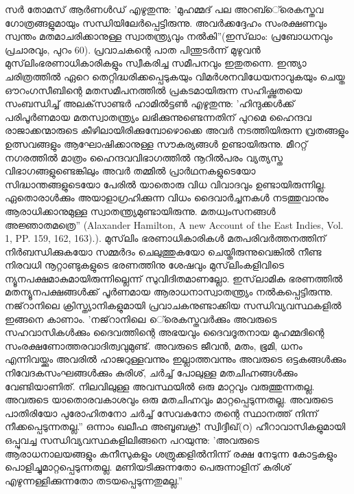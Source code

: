സര്‍ തോമസ് ആര്‍ണള്‍ഡ് എഴുതുന്നു: 'മുഹമ്മദ് പല അറബ്‌െ്രെകസ്തവ ഗോത്രങ്ങളുമായും സന്ധിയിലേര്‍പ്പെട്ടിരുന്നു. അവര്‍ക്കദ്ദേഹം സംരക്ഷണവും സ്വന്തം മതമാചരിക്കാനുള്ള സ്വാതന്ത്യ്രവും നല്‍കി''(ഇസ്‌ലാം: പ്രബോധനവും പ്രചാരവും, പുറം 60).
പ്രവാചകന്റെ പാത പിന്തുടര്‍ന്ന് മുഴുവന്‍ മുസ്‌ലിംഭരണാധികാരികളും സ്വീകരിച്ച സമീപനവും ഇതുതന്നെ. ഇന്ത്യാ ചരിത്രത്തില്‍ ഏറെ തെറ്റിദ്ധരിക്കപ്പെടുകയും വിമര്‍ശനവിധേയനാവുകയും ചെയ്ത ഔറംഗസീബിന്റെ മതസമീപനത്തില്‍ പ്രകടമായിരുന്ന സഹിഷ്ണുതയെ സംബന്ധിച്ച് അലക്‌സാണ്ടര്‍ ഹാമില്‍ട്ടണ്‍ എഴുതുന്നു: 'ഹിന്ദുക്കള്‍ക്ക് പരിപൂര്‍ണമായ മതസ്വാതന്ത്യ്രം ലഭിക്കുന്നുണ്ടെന്നതിന് പുറമെ ഹൈന്ദവ രാജാക്കന്മാരുടെ കീഴിലായിരിക്കുമ്പോഴൊക്കെ അവര്‍ നടത്തിയിരുന്ന വ്രതങ്ങളും ഉത്സവങ്ങളും ആഘോഷിക്കാനുള്ള സൗകര്യങ്ങള്‍ ഉണ്ടായിരുന്നു. മീററ്റ് നഗരത്തില്‍ മാത്രം ഹൈന്ദവവിഭാഗത്തില്‍ നൂറില്‍പരം വ്യത്യസ്ത വിഭാഗങ്ങളുണ്ടെങ്കിലും അവര്‍ തമ്മില്‍ പ്രാര്‍ഥനകളുടെയോ സിദ്ധാന്തങ്ങളുടെയോ പേരില്‍ യാതൊരു വിധ വിവാദവും ഉണ്ടായിരുന്നില്ല. ഏതൊരാള്‍ക്കും അയാളാഗ്രഹിക്കുന്ന വിധം ദൈവാര്‍ച്ചനകള്‍ നടത്തുവാനും ആരാധിക്കാനുമുള്ള സ്വാതന്ത്യ്രമുണ്ടായിരുന്നു. മതധ്വംസനങ്ങള്‍ അജ്ഞാതമത്രെ'' (Alaxander Hamilton, A new Account of the East Indies, Vol. 1, PP. 159, 162, 163).).
മുസ്‌ലിം ഭരണാധികാരികള്‍ മതപരിവര്‍ത്തനത്തിന് നിര്‍ബന്ധിക്കുകയോ സമ്മര്‍ദം ചെലുത്തുകയോ ചെയ്തിരുന്നുവെങ്കില്‍ നീണ്ട നിരവധി നൂറ്റാണ്ടുകളുടെ ഭരണത്തിനു ശേഷവും മുസ്‌ലിംകളിവിടെ ന്യൂനപക്ഷമാകുമായിരുന്നില്ലെന്ന് സുവിദിതമാണല്ലോ.
ഇസ്‌ലാമിക ഭരണത്തില്‍ മതന്യൂനപക്ഷങ്ങള്‍ക്ക് പൂര്‍ണമായ ആരാധനാസ്വാതന്ത്യ്രം നല്‍കപ്പെട്ടിരുന്നു. നജ്‌റാനിലെ ക്രിസ്ത്യാനികളുമായി പ്രവാചകനുണ്ടാക്കിയ സന്ധിവ്യവസ്ഥകളില്‍ ഇങ്ങനെ കാണാം. 'നജ്‌റാനിലെ െ്രെകസ്തവര്‍ക്കും അവരുടെ സഹവാസികള്‍ക്കും ദൈവത്തിന്റെ അഭയവും ദൈവദൂതനായ മുഹമ്മദിന്റെ സംരക്ഷണോത്തരവാദിത്വവുമുണ്ട്. അവരുടെ ജീവന്‍, മതം, ഭൂമി, ധനം എന്നിവയ്ക്കും അവരില്‍ ഹാജറുള്ളവന്നും ഇല്ലാത്തവന്നും അവരുടെ ഒട്ടകങ്ങള്‍ക്കും നിവേദകസംഘങ്ങള്‍ക്കും കുരിശ്, ചര്‍ച്ച് പോലുള്ള മതചിഹ്നങ്ങള്‍ക്കും വേണ്ടിയാണിത്. നിലവിലുള്ള അവസ്ഥയില്‍ ഒരു മാറ്റവും വരുത്തുന്നതല്ല. അവരുടെ യാതൊരവകാശവും ഒരു മതചിഹ്നവും മാറ്റപ്പെടുന്നതല്ല. അവരുടെ പാതിരിയോ പുരോഹിതനോ ചര്‍ച്ച് സേവകനോ തന്റെ സ്ഥാനത്ത് നിന്ന് നീക്കപ്പെടുന്നതല്ല.''
ഒന്നാം ഖലീഫ അബൂബക്ര്! സ്വിദ്ദീഖ്(റ) ഹീറാവാസികളുമായി ഒപ്പുവച്ച സന്ധിവ്യവസ്ഥകളിലിങ്ങനെ പറയുന്നു: 'അവരുടെ ആരാധനാലയങ്ങളും കനീസുകളും ശത്രുക്കളില്‍നിന്ന് രക്ഷ നേടുന്ന കോട്ടകളും പൊളിച്ചുമാറ്റപ്പെടുന്നതല്ല. മണിയടിക്കുന്നതോ പെരുന്നാളിന് കുരിശ് എഴുന്നള്ളിക്കുന്നതോ തടയപ്പെടുന്നതുമല്ല.''

